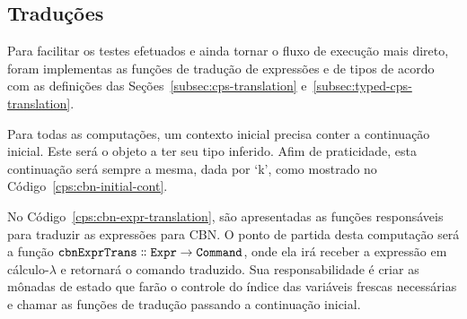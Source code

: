 \subsection{Traduções}\label{subsec:cps-translations}
Para facilitar os testes efetuados e ainda tornar o fluxo de execução mais direto, foram implementas as funções de tradução de expressões e de tipos de acordo com as definições das Seções~\ref{subsec:cps-translation} e~\ref{subsec:typed-cps-translation}.


Para todas as computações, um contexto inicial precisa conter a continuação inicial.
Este será o objeto a ter seu tipo inferido.
Afim de praticidade, esta continuação será sempre a mesma, dada por `k', como mostrado no Código~\ref{cps:cbn-initial-cont}.


No Código~\ref{cps:cbn-expr-translation}, são apresentadas as funções responsáveis para traduzir as expressões para CBN.
O ponto de partida desta computação será a função $\mathtt{cbnExprTrans \dblcolon Expr \to Command}$, onde ela irá receber a expressão em cálculo-$\lambda$ e retornará o comando traduzido.
Sua responsabilidade é criar as mônadas de estado que farão o controle do índice das variáveis frescas necessárias e chamar as funções de tradução passando a continuação inicial.

